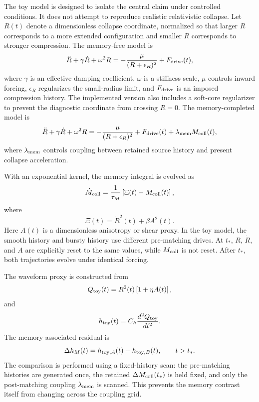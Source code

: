 \documentclass[11pt]{article}
\begin{document}
The toy model is designed to isolate the central claim under controlled conditions. It does not attempt to reproduce realistic relativistic collapse. Let \(R(t)\) denote a dimensionless collapse coordinate, normalized so that larger \(R\) corresponds to a more extended configuration and smaller \(R\) corresponds to stronger compression. The memory-free model is
\begin{equation}
\ddot{R}+\gamma\dot{R}+\omega^2R=-\frac{\mu}{(R+\epsilon_R)^2}+F_{\rm drive}(t),
\label{eq:toy_markovian}
\end{equation}
where \(\gamma\) is an effective damping coefficient, \(\omega\) is a stiffness scale, \(\mu\) controls inward forcing, \(\epsilon_R\) regularizes the small-radius limit, and \(F_{\rm drive}\) is an imposed compression history. The implemented version also includes a soft-core regularizer to prevent the diagnostic coordinate from crossing \(R=0\). The memory-completed model is
\begin{equation}
\ddot{R}+\gamma\dot{R}+\omega^2R=-\frac{\mu}{(R+\epsilon_R)^2}+F_{\rm drive}(t)+\lambda_{\rm mem}M_{\rm coll}(t),
\label{eq:toy_nonmarkovian}
\end{equation}
where \(\lambda_{\rm mem}\) controls coupling between retained source history and present collapse acceleration.

With an exponential kernel, the memory integral is evolved as
\begin{equation}
\dot{M}_{\rm coll}=\frac{1}{\tau_M}\left[\Xi(t)-M_{\rm coll}(t)\right],
\label{eq:toy_memory_ode}
\end{equation}
where
\begin{equation}
\Xi(t)=\dot{R}^2(t)+\beta A^2(t).
\label{eq:toy_history_observable}
\end{equation}
Here \(A(t)\) is a dimensionless anisotropy or shear proxy. In the toy model, the smooth history and bursty history use different pre-matching drives. At \(t_\ast\), \(R\), \(\dot R\), and \(A\) are explicitly reset to the same values, while \(M_{\rm coll}\) is not reset. After \(t_\ast\), both trajectories evolve under identical forcing.

The waveform proxy is constructed from
\begin{equation}
Q_{\rm toy}(t)=R^2(t)\left[1+\eta A(t)\right],
\end{equation}
and
\begin{equation}
h_{\rm toy}(t)=C_h\frac{d^2Q_{\rm toy}}{dt^2}.
\label{eq:toy_waveform}
\end{equation}
The memory-associated residual is
\begin{equation}
\Delta h_M(t)=h_{{\rm toy},A}(t)-h_{{\rm toy},B}(t),\qquad t>t_\ast.
\end{equation}
The comparison is performed using a fixed-history scan: the pre-matching histories are generated once, the retained \(\Delta M_{\rm coll}(t_\ast)\) is held fixed, and only the post-matching coupling \(\lambda_{\rm mem}\) is scanned. This prevents the memory contrast itself from changing across the coupling grid.
\end{document}
